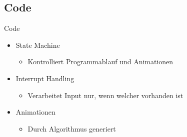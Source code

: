 \documentclass[mathserif,9pt]{article}
\begin{document}
    \subsection{Code}
    \begin{frame}{Code}
        \begin{block}{}
            \begin{itemize}
                \item State Machine
                 \begin{itemize}
                    \item Kontrolliert Programmablauf und Animationen
                \end{itemize}
                \item Interrupt Handling
                \begin{itemize}
                    \item Verarbeitet Input nur, wenn welcher vorhanden ist
                \end{itemize}
                \item Animationen
                \begin{itemize}
                    \item Durch Algorithmus generiert
                \end{itemize}
            \end{itemize}
        \end{block}
    \end{frame}
    
\end{document}

